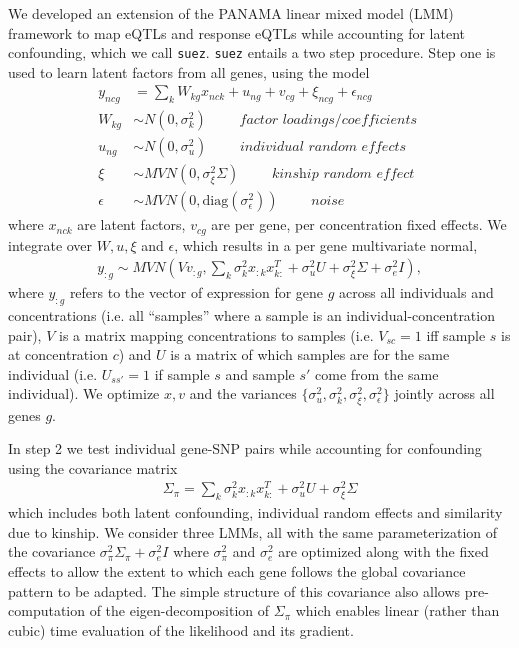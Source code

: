 \documentclass{article}
\begin{document}
We developed an extension of the PANAMA\cite{Fusi2012} linear mixed model (LMM) framework to map eQTLs and response eQTLs while accounting for latent confounding, which we call \texttt{suez}. \texttt{suez} entails a two step procedure. Step one is used to learn latent factors from all genes, using the model
\begin{align*}
y_{ncg} &= \sum_k W_{kg} x_{nck} + u_{ng} + v_{cg} + \xi_{ncg} + \epsilon_{ncg} \\
W_{kg} & \sim N(0, \sigma^2_k ) \qquad \textit{ factor loadings/coefficients } \\ 
u_{ng} &\sim N(0, \sigma^2_u) \qquad \textit{ individual random effects } \\
\xi &\sim MVN(0, \sigma^2_\xi \Sigma ) \qquad \textit{ kinship random effect }  \\
\epsilon &\sim MVN(0, \text{diag}(\sigma^2_\epsilon)) \qquad \textit{ noise } 
\end{align*}
where $x_{nck}$ are latent factors, $v_{cg}$ are per gene, per concentration fixed effects. We integrate over $W, u, \xi$ and $\epsilon$, which results in a per gene multivariate normal,
\begin{align}
y_{:g} \sim MVN\left( V v_{:g} , \sum_k \sigma^2_k x_{:k} x_{k:}^T + \sigma^2_u U + \sigma^2_\xi \Sigma + \sigma^2_e I \right),
\end{align}
where $y_{:g}$ refers to the vector of expression for gene $g$ across all individuals and concentrations (i.e. all ``samples'' where a sample is an individual-concentration pair), $V$ is a matrix mapping concentrations to samples (i.e. $V_{sc}=1$ iff sample $s$ is at concentration $c$) and $U$ is a matrix of which samples are for the same individual (i.e. $U_{ss'}=1$ if sample $s$ and sample $s'$ come from the same individual). We optimize $x,v$ and the variances $\{ \sigma^2_u, \sigma^2_k,  \sigma^2_\xi, \sigma^2_\epsilon \}$ jointly across all genes $g$. 

In step 2 we test individual gene-SNP pairs while accounting for confounding using the covariance matrix 
\begin{align}
 \Sigma_\pi = \sum_k \sigma^2_k x_{:k} x_{k:}^T + \sigma^2_u U + \sigma^2_\xi \Sigma 
 \end{align}
which includes both latent confounding, individual random effects and similarity due to kinship. We consider three LMMs, all with the same parameterization of the covariance $\sigma^2_\pi \Sigma_\pi + \sigma^2_e I$ where $\sigma^2_\pi$ and $\sigma^2_e$ are optimized along with the fixed effects to allow the extent to which each gene follows the global covariance pattern to be adapted. The simple structure of this covariance also allows pre-computation of the eigen-decomposition of $\Sigma_\pi$ which enables linear (rather than cubic) time evaluation of the likelihood and its gradient. 
\end{document}
